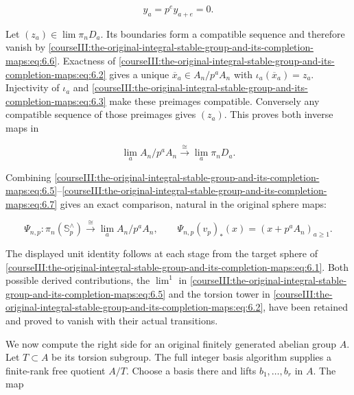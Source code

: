 \begin{equation}
y_a=p^ey_{a+e}=0.
 \label{courseIII:the-original-integral-stable-group-and-its-completion-maps:eq:6.6}
\end{equation}

Let \((z_a)\in\lim\pi_nD_a\). Its boundaries form a compatible sequence and therefore vanish by \eqref{courseIII:the-original-integral-stable-group-and-its-completion-maps:eq:6.6}. Exactness of \eqref{courseIII:the-original-integral-stable-group-and-its-completion-maps:eq:6.2} gives a unique \(\overline x_a\in A_n/p^aA_n\) with \(\iota_a(\overline x_a)=z_a\). Injectivity of \(\iota_a\) and \eqref{courseIII:the-original-integral-stable-group-and-its-completion-maps:eq:6.3} make these preimages compatible. Conversely any compatible sequence of those preimages gives \((z_a)\). This proves both inverse maps in

\begin{equation}
\lim_a A_n/p^aA_n\xrightarrow{\cong}\lim_a\pi_nD_a.
 \label{courseIII:the-original-integral-stable-group-and-its-completion-maps:eq:6.7}
\end{equation}

Combining \eqref{courseIII:the-original-integral-stable-group-and-its-completion-maps:eq:6.5}--\eqref{courseIII:the-original-integral-stable-group-and-its-completion-maps:eq:6.7} gives an exact comparison, natural in the original sphere maps:

\begin{equation}
\Psi_{n,p}:\pi_n(\mathbb S^{\wedge}_p)
       \xrightarrow{\cong}\lim_a A_n/p^aA_n,
 \qquad
 \Psi_{n,p}(v_p)_*(x)=(x+p^aA_n)_{a\geq1}.
 \label{courseIII:the-original-integral-stable-group-and-its-completion-maps:eq:6.8}
\end{equation}

The displayed unit identity follows at each stage from the target sphere of \eqref{courseIII:the-original-integral-stable-group-and-its-completion-maps:eq:6.1}. Both possible derived contributions, the \(\lim^1\) in \eqref{courseIII:the-original-integral-stable-group-and-its-completion-maps:eq:6.5} and the torsion tower in \eqref{courseIII:the-original-integral-stable-group-and-its-completion-maps:eq:6.2}, have been retained and proved to vanish with their actual transitions.

We now compute the right side for an original finitely generated abelian group \(A\). Let \(T\subset A\) be its torsion subgroup. The full integer basis algorithm supplies a finite-rank free quotient \(A/T\). Choose a basis there and lifts \(b_1,\ldots,b_r\) in \(A\). The map

